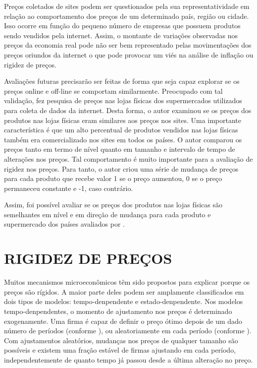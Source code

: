 \documentclass[twoside,a4paper,12pt]{report}
\begin{document}
Preços coletados de sites podem ser questionados pela sua representatividade em relação ao comportamento dos preços de um determinado país, região ou cidade. Isso ocorre em função do pequeno número de empresas que possuem produtos sendo vendidos pela internet. Assim, o montante de variações observadas nos preços da economia real pode não ser bem representado pelas movimentações dos preços oriundos da internet o que pode provocar um viés na análise de inflação ou rigidez de preços. 

  Avaliações futuras precisarão ser feitas de forma que seja capaz explorar se os preços online e off-line se comportam similarmente. Preocupado com tal validação, \citet{cavallo2010scraped} fez pesquisa de preços nas lojas físicas dos supermercados utilizados para coleta de dados da internet. Desta forma, o autor examinou se os preços dos produtos nas lojas físicas eram similares aos preços nos sites. Uma importante característica é que um alto percentual de produtos vendidos nas lojas físicas também era comercializado nos sites em todos os países. O autor comparou os preços tanto em termo de nível quanto em tamanho e intervalo de tempo de alterações nos preços. Tal comportamento é muito importante para a avaliação de rigidez nos preços. Para tanto, o autor criou uma série de mudança de preços para cada produto que recebe valor 1 se o preço aumentou, 0 se o preço permaneceu constante e -1, caso contrário. 
  
  Assim, foi possível avaliar se os preços dos produtos nas lojas físicas são semelhantes em nível e em direção de mudança para cada produto e supermercado dos países avaliados por \citet{cavallo2010scraped}.

\section*{RIGIDEZ DE PREÇOS}

Muitos mecanismos microeconômicos têm sido propostos para explicar porque os preços são rígidos. A maior parte deles podem ser amplamente classificados em dois tipos de modelos: tempo-denpendente e estado-denpendente. Nos modelos tempo-denpendentes, o momento de ajustamento nos preços é determinado exogenamente. Uma firma é capaz de definir o preço ótimo depois de um dado número de períodos (conforme \citet{taylor1980aggregate}), ou aleatoriamente em cada período (conforme \citet{calvo1983staggered}). Com ajustamentos aleatórios, mudanças nos preços de qualquer tamanho são possíveis e existem uma fração estável de firmas ajustando em cada período, independentemente de quanto tempo já passou desde a última alteração no preço. 
\end{document}
